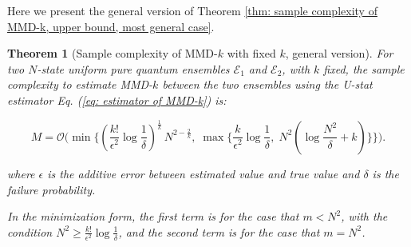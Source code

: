 \documentclass[aps,prx,reprint,superscriptaddress,amsmath,amssymb,longbibliography,floatfix]{revtex4-2}
\newcommand{\scE}{\mathcal{E}}
\newcommand{\JY}[1]{{\textcolor{orange}{#1}}}
\theoremstyle{plain}
\newtheorem{theorem}{Theorem}[section]
\theoremstyle{definition}
\theoremstyle{remark}
\begin{document}
Here we present the general version of Theorem \ref{thm: sample complexity of MMD-k, upper bound, most general case}.
\begin{theorem}[Sample complexity of MMD-$k$ with fixed $k$, general version]
    For two $N$-state uniform pure quantum ensembles $\scE_1$ and $\scE_2$, with $k$ fixed, the sample complexity to estimate MMD-$k$ between the two ensembles using the U-stat estimator Eq. (\ref{eq: estimator of MMD-k}) is:
    \begin{widetext}
\begin{equation}\label{eq: sample complexity of MMD-k, upper bound for general case}
    M
    = \mathcal{O}\Bigg(
    \min\Bigg\{
    \left(\frac{k!}{\epsilon^2}\log\frac{1}{\delta}\right)^{\!\frac{1}{k}}
    \,N^{2-\frac{2}{k}},
    \;
    \max\Bigg\{
    \frac{k}{\epsilon^2}\log\frac{1}{\delta},
    \;
    N^2\!\left(\log\frac{N^2}{\delta} + k\right)
    \Bigg\}
    \Bigg\}
    \Bigg).
    \end{equation}
\end{widetext}
    where $\epsilon$ is the additive error between estimated value and true value and $\delta$ is the failure probability.

    In the minimization form, the first term is for the case that $m<N^2$, with the condition $N^2 \ge \frac{k!}{\epsilon^2}\log\frac{1}{\delta}$, and the second term is for the case that $m=N^2$.
\label{theorem:general_version}
\end{theorem}
\end{document}
